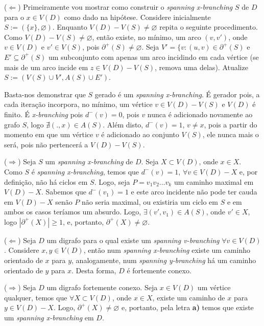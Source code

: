 
($\Leftarrow$) Primeiramente vou mostrar como construir o {\it spanning x-branching} $S$ de $D$ para o $x \in V(D)$ como dado na hipótese.
%
Considere inicialmente $S := (\{x\}, \varnothing)$.
%
Enquanto $V(D)-V(S) \ne \varnothing$ repita o seguinte procedimento.
%
Como $V(D)-V(S) \ne \varnothing$, então existe, no mínimo, um arco $(v,v')$, onde $v \in V(D)$ e $v' \in V(S)$, pois $\partial^+(S) \ne \varnothing$.
%
Seja $V' = \{v: (u,v) \in \partial^+(S)$ e $E' \subseteq \partial^+(S)$ um subconjunto com apenas um arco incidindo em cada vértice (se mais de um arco incide em $z \in V(D)-V(S)$, remova uma delas).
%
Atualize $S := (V(S)\cup V', A(S) \cup E')$.

Basta-nos demonstrar que $S$ gerado é um {\it spanning x-branching}.
%
É gerador pois, a cada iteração incorpora, no mínimo, um vértice $v \in V(D)-V(S)$ e $V(D)$ é finito.
%
É {\it x-branching} pois $d^-(v) = 0$, pois $v$ nunca é adicionado novamente ao grafo $S$, logo $\nexists (.,x) \in A(S)$.
%
Além disto, $d^-(v) = 1$, $v\ne x$, pois a partir do momento em que um vértice $v$ é adicionado ao conjunto $V(S)$, ele nunca mais o será, pois não pertencerá a $V(D)-V(S)$.

($\Rightarrow$) Seja $S$ um {\it spanning x-branching} de $D$.
%
Seja $X \subset V(D)$, onde $x \in X$. Como $S$ é {\it spanning x-branching}, temos que $d^-(v) = 1$, $\forall v \in V(D)-X$ e, por definição, não há ciclos em $S$.
%
Logo, seja $P = v_1v_2\ldots v_k$ um caminho maximal em $V(D) - X$. Sabemos que $d^-(v_1) = 1$ e este arco incidente não pode ter cauda em $V(D) - X$ senão $P$ não seria maximal, ou existiria um ciclo em $S$ e em ambos os casos teríamos um absurdo.
%
Logo, $\exists (v',v_1) \in A(S)$, onde $v' \in X$, logo $|\partial^+(X)| \ge 1$, e, portanto, $\partial^+(X) \ne \varnothing$.
\fimprova

 ($\Leftarrow$) Seja $D$ um digrafo para o qual existe um {\it spanning v-branching} $\forall v \in V(D)$.
%
Considere $x,y \in V(D)$, então num {\it spanning x-branching} existe um caminho orientado de $x$ para $y$, analogamente, num {\it spanning y-branching} há um caminho orientado de $y$ para $x$.
%
Desta forma, $D$ é fortemente conexo.

($\Rightarrow$) Seja $D$ um digrafo fortemente conexo.
%
Seja $x \in V(D)$ um vértice qualquer, temos que $\forall X \subset V(D)$, onde $x \in X$, existe um caminho de $x$ para $y \in V(D) - X$. Logo, $\partial^+(X) \ne \varnothing$ e, portanto, pela letra {\bf a)} temos que existe um {\it spanning x-branching} em $D$.
\fimprova

